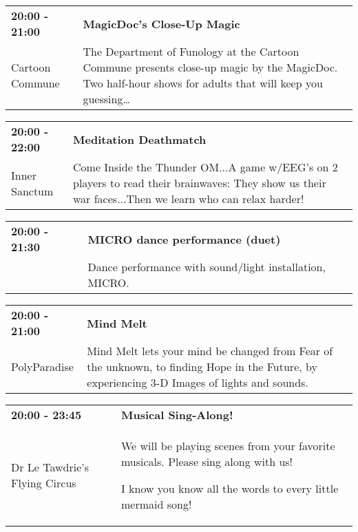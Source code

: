 \begin{tabular}{ p{1in} p{2.2in} }
    \textbf{20:00 - 21:00} & \textbf{MagicDoc's Close-Up Magic } \\
    Cartoon Commune \newline  & The Department of Funology at the Cartoon Commune presents close-up magic by the MagicDoc. Two half-hour shows for adults that will keep you guessing\ldots \\
    \hline 
\end{tabular}
    
\begin{tabular}{ p{1in} p{2.2in} }
    \textbf{20:00 - 22:00} & \textbf{Meditation Deathmatch} \\
    Inner Sanctum \newline  & Come Inside the Thunder OM...A game w/EEG's on 2 players to read their brainwaves: They show us their war faces...Then we learn who can relax harder! \\
    \hline 
\end{tabular}
    
\begin{tabular}{ p{1in} p{2.2in} }
    \textbf{20:00 - 21:30} & \textbf{MICRO dance performance (duet)} \\
    ~ \newline  & Dance performance with sound/light installation, MICRO. \\
    \hline 
\end{tabular}
    
\begin{tabular}{ p{1in} p{2.2in} }
    \textbf{20:00 - 21:00} & \textbf{Mind Melt } \\
    PolyParadise \newline  & Mind Melt lets your mind be changed from Fear of the unknown, to finding Hope in the Future, by experiencing 3-D Images of lights and sounds. \\
    \hline 
\end{tabular}
    
\begin{tabular}{ p{1in} p{2.2in} }
    \textbf{20:00 - 23:45} & \textbf{Musical Sing-Along!} \\
    Dr Le Tawdrie's Flying Circus \newline  & We will be playing scenes from your favorite musicals.  Please sing along with us! 

I know you know all the words to every little mermaid song! \\
    \hline 
\end{tabular}
    
